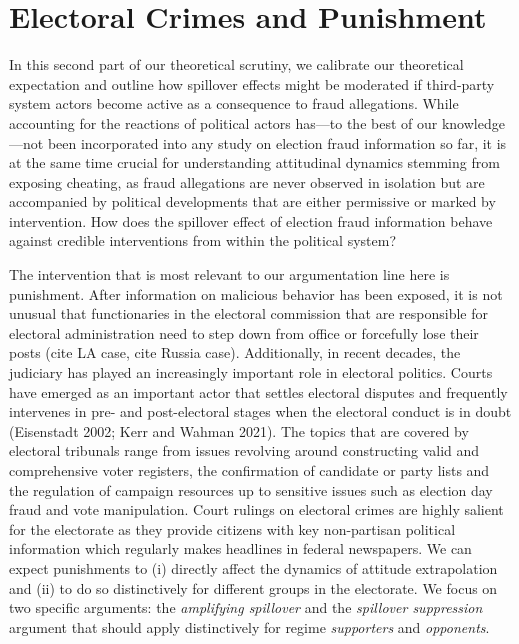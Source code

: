 \documentclass[11pt, ngerman,english,a4]{article}
\begin{document}
\section*{Electoral Crimes and Punishment}
In this second part of our theoretical scrutiny, we calibrate our theoretical expectation and outline how spillover effects might be moderated if third-party system actors become active as a consequence to fraud allegations. While accounting for the reactions of political actors has---to the best of our knowledge---not been incorporated into any study on election fraud information so far, it is at the same time crucial for understanding attitudinal dynamics stemming from exposing cheating, as fraud allegations are never observed in isolation but are accompanied by political developments that are either permissive or marked by intervention. How does the spillover effect of election fraud information behave against credible interventions from within the political system? 

The intervention that is most relevant to our argumentation line here is punishment. After information on malicious behavior has been exposed, it is not unusual that functionaries in the electoral commission that are responsible for electoral administration need to step down from office or forcefully lose their posts (cite LA case, cite Russia case). Additionally, in recent decades, the judiciary has played an increasingly important role in electoral politics. Courts have emerged as an important actor that settles electoral disputes and frequently intervenes in pre- and post-electoral stages when the electoral conduct is in doubt (Eisenstadt 2002; Kerr and Wahman 2021). The topics that are covered by electoral tribunals range from issues revolving around constructing valid and comprehensive voter registers, the confirmation of candidate or party lists and the regulation of campaign resources up to sensitive issues such as election day fraud and vote manipulation. Court rulings on electoral crimes are highly salient for the electorate as they provide citizens with key non-partisan political information which regularly makes headlines in federal newspapers. We can expect punishments to (i) directly affect the dynamics of attitude extrapolation and (ii) to do so distinctively for different groups in the electorate. We focus on two specific arguments: the \textit{amplifying spillover} and the \textit{spillover suppression} argument that should apply distinctively for regime \textit{supporters} and \textit{opponents}. 
\end{document}
